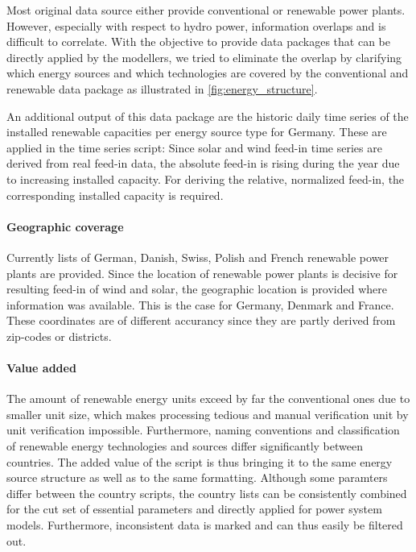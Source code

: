 \documentclass[article]{elsarticle}
\begin{document}
Most original data source either provide conventional or renewable power plants. However, especially with respect to hydro power, information overlaps and is difficult to correlate. With the objective to provide data packages that can be directly applied by the modellers, we tried to eliminate the overlap by clarifying which energy sources and which technologies are covered by the conventional and renewable data package as illustrated in \ref{fig:energy_structure}.

An additional output of this data package are the historic daily time series of the installed renewable capacities per energy source type for Germany. These are applied in the time series script: Since solar and wind feed-in time series are derived from real feed-in data, the absolute feed-in is rising during the year due to increasing installed capacity. For deriving the relative, normalized feed-in, the corresponding installed capacity is required.

\paragraph{Geographic coverage} Currently lists of German, Danish, Swiss, Polish and French renewable power plants are provided. Since the location of renewable power plants is decisive for resulting feed-in of wind and solar, the geographic location is provided where information was available. This is the case for Germany, Denmark and France. These coordinates are of different accurancy since they are partly derived from zip-codes or districts.


\paragraph{Value added}
The amount of renewable energy units exceed by far the conventional ones due to smaller unit size, which makes processing tedious and manual verification unit by unit verification impossible. Furthermore, naming conventions and classification of renewable energy technologies and sources differ significantly between countries. The added value of the script is thus bringing it to the same energy source structure as well as to the same formatting. Although some paramters differ between the country scripts, the country lists can be consistently combined for the cut set of essential parameters and directly applied for power system models. Furthermore, inconsistent data is marked and can thus easily be filtered out.
\end{document}
